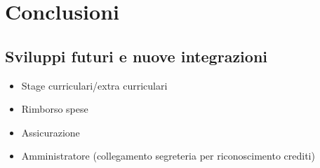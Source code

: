 \chapter{Conclusioni}

\section{Sviluppi futuri e nuove integrazioni}

\begin{itemize}
	\item Stage curriculari/extra curriculari
	\item  Rimborso spese
	\item  Assicurazione
	\item Amministratore (collegamento segreteria per riconoscimento crediti)
\end{itemize}
